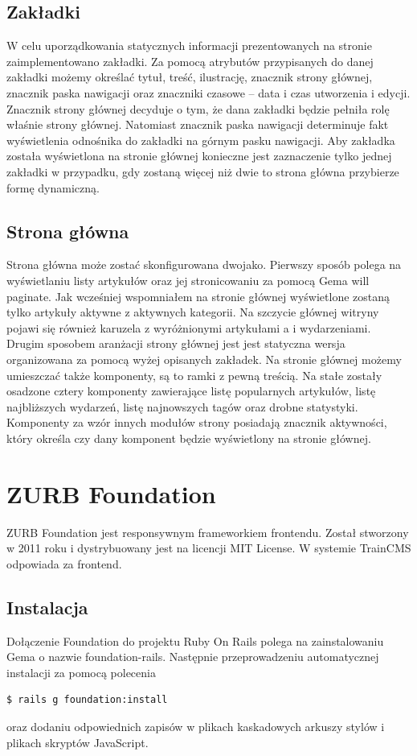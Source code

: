 \documentclass[openright]{xmgr}
\begin{document}
\subsection{Zakładki}
W celu uporządkowania statycznych informacji prezentowanych na stronie zaimplementowano zakładki. Za pomocą atrybutów przypisanych do danej zakładki możemy określać tytuł, treść, ilustrację, znacznik strony głównej, znacznik paska nawigacji oraz znaczniki czasowe – data i czas utworzenia i edycji. Znacznik strony głównej decyduje o tym, że dana zakładki będzie pełniła rolę właśnie strony głównej. Natomiast znacznik paska nawigacji determinuje fakt wyświetlenia odnośnika do zakładki na górnym pasku nawigacji. Aby zakładka została wyświetlona na stronie głównej konieczne jest zaznaczenie tylko jednej zakładki w przypadku, gdy zostaną więcej niż dwie to strona główna przybierze formę dynamiczną.

\subsection{Strona główna}
Strona główna może zostać skonfigurowana dwojako. Pierwszy sposób polega na wyświetlaniu listy artykułów oraz jej stronicowaniu za pomocą Gema will paginate. Jak wcześniej wspomniałem na stronie głównej wyświetlone zostaną tylko artykuły aktywne z aktywnych kategorii. Na szczycie głównej witryny pojawi się również karuzela z wyróżnionymi artykułami a i wydarzeniami. Drugim sposobem aranżacji strony głównej jest jest statyczna wersja organizowana za pomocą wyżej opisanych zakładek. Na stronie głównej możemy umieszczać także komponenty, są to ramki z pewną treścią. Na stałe zostały osadzone cztery komponenty zawierające listę popularnych artykułów, listę najbliższych wydarzeń, listę najnowszych tagów oraz drobne statystyki. Komponenty za wzór innych modułów strony posiadają znacznik aktywności, który określa czy dany komponent będzie wyświetlony na stronie głównej. 

\newpage

\section{ZURB Foundation}
ZURB Foundation jest responsywnym frameworkiem frontendu. Został stworzony w 2011 roku i dystrybuowany jest na licencji MIT License. W systemie TrainCMS odpowiada za frontend. 

\subsection{Instalacja}
Dołączenie Foundation do projektu Ruby On Rails polega na zainstalowaniu Gema o nazwie foundation-rails. Następnie przeprowadzeniu automatycznej instalacji za pomocą polecenia 
\begin{lstlisting}[language=bash]
$ rails g foundation:install 
\end{lstlisting} 
oraz dodaniu odpowiednich zapisów w plikach kaskadowych arkuszy stylów i plikach skryptów JavaScript.
\end{document}
